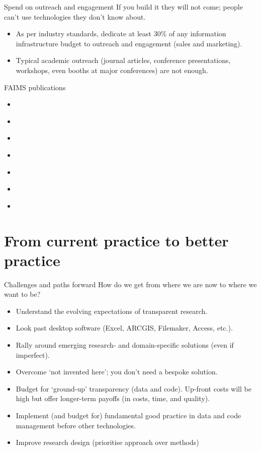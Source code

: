 \documentclass[aspectratio=169, 12pt]{beamer} %
\begin{document}
\begin{frame}{Spend on outreach and engagement}
  If you build it they will not come; people can't use technologies they don't know about.
      \begin{itemize}[label=\textbullet]
        \item As per industry standards, dedicate at least 30\% of any information infrastructure budget to outreach and engagement (sales and marketing). 
        \item Typical academic outreach (journal articles, conference presentations, workshops, even booths at major conferences) are not enough.
    \end{itemize}
\end{frame}

\begin{frame}{FAIMS publications}
      \begin{itemize}[label=\textbullet]
        \item \cite{Sobotkova2018-al}
        \item \cite{Ballsun-Stanton2018-zd}
        \item \cite{VanValkenburgh2018-hv}
        \item \cite{sobotkova2016-mx}
        \item \cite{Ross2015-ph} 
        \item \cite{Sobotkova2015-lq}
        \item \cite{Ross2013-hi}
    \end{itemize}
\end{frame}

\section{From current practice to better practice}

\begin{frame}{Challenges and paths forward}
  How do we get from where we are now to where we want to be?
      \begin{itemize}[label=\textbullet]
        \item Understand the evolving expectations of transparent research. 
        \item Look past desktop software (Excel, ARCGIS, Filemaker, Access, etc.).
        \item Rally around emerging research- and domain-specific solutions (even if imperfect).
        \item Overcome `not invented here'; you don't need a bespoke solution.
        \item Budget for `ground-up' transparency (data and code). Up-front costs will be high but offer longer-term payoffs (in costs, time, and quality).
        \item Implement (and budget for) fundamental good practice in data and code management before other technologies.
        \item Improve research design (prioritise approach over methods) \cite{Muthukrishna2019-kt, Hole1973-cy}
    \end{itemize}
\end{frame}
\end{document}
